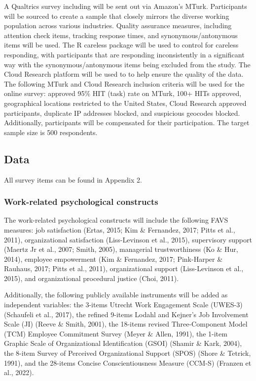 \documentclass[
  man]{apa7}
\begin{document}
A Qualtrics survey including will be sent out via Amazon's MTurk. Participants will be sourced to create a sample that closely mirrors the diverse working population across various industries. Quality assurance measures, including attention check items, tracking response times, and synonymous/antonymous items will be used. The R careless package will be used to control for careless responding, with participants that are responding inconsistently in a significant way with the synonymous/antonymous items being excluded from the study. The Cloud Research platform will be used to to help ensure the quality of the data. The following MTurk and Cloud Research inclusion criteria will be used for the online survey: approved 95\% HIT (task) rate on MTurk, 100+ HITs approved, geographical locations restricted to the United States, Cloud Research approved participants, duplicate IP addresses blocked, and suspicious geocodes blocked. Additionally, participants will be compensated for their participation. The target sample size is 500 respondents.

\hypertarget{data-1}{%
\subsection{Data}\label{data-1}}

All survey items can be found in Appendix 2.

\hypertarget{work-related-psychological-constructs}{%
\subsubsection{Work-related psychological constructs}\label{work-related-psychological-constructs}}

The work-related psychological constructs will include the following FAVS measures: job satisfaction (Ertas, 2015; Kim \& Fernandez, 2017; Pitts et al., 2011), organizational satisfaction (Liss-Levinson et al., 2015), supervisory support (Maertz Jr et al., 2007; Smith, 2005), managerial trustworthiness (Ko \& Hur, 2014), employee empowerment (Kim \& Fernandez, 2017; Pink-Harper \& Rauhaus, 2017; Pitts et al., 2011), organizational support (Liss-Levinson et al., 2015), and organizational procedural justice (Choi, 2011).

Additionally, the following publicly available instruments will be added as independent variables: the 3-items Utrecht Work Engagement Scale (UWES-3) (Schaufeli et al., 2017), the refined 9-items Lodahl and Kejner's Job Involvement Scale (JI) (Reeve \& Smith, 2001), the 18-items revised Three-Component Model (TCM) Employee Commitment Survey (Meyer \& Allen, 1991), the 1-item Graphic Scale of Organizational Identification (GSOI) (Shamir \& Kark, 2004), the 8-item Survey of Perceived Organizational Support (SPOS) (Shore \& Tetrick, 1991), and the 28-items Concise Conscientiousness Measure (CCM-S) (Franzen et al., 2022).
\end{document}
